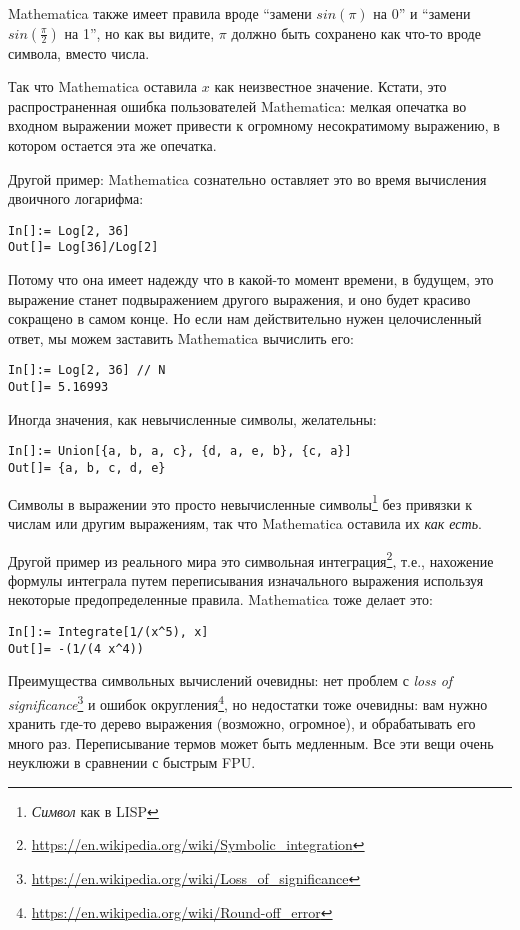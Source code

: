 Mathematica также имеет правила вроде ``замени $sin(\pi)$ на 0'' и ``замени $sin(\frac{\pi}{2})$ на 1'', но как вы видите,
$\pi$ должно быть сохранено как что-то вроде символа, вместо числа.

Так что Mathematica оставила $x$ как неизвестное значение.
Кстати, это распространенная ошибка пользователей Mathematica: мелкая опечатка во входном выражении может привести к
огромному несократимому выражению, в котором остается эта же опечатка.

Другой пример: Mathematica сознательно оставляет это во время вычисления двоичного логарифма:

\begin{lstlisting}
In[]:= Log[2, 36]
Out[]= Log[36]/Log[2]
\end{lstlisting}

Потому что она имеет надежду что в какой-то момент времени, в будущем, это выражение станет подвыражением другого
выражения, и оно будет красиво сокращено в самом конце.
Но если нам действительно нужен целочисленный ответ, мы можем заставить Mathematica вычислить его:

\begin{lstlisting}
In[]:= Log[2, 36] // N
Out[]= 5.16993
\end{lstlisting}

Иногда значения, как невычисленные символы, желательны:

\begin{lstlisting}
In[]:= Union[{a, b, a, c}, {d, a, e, b}, {c, a}]
Out[]= {a, b, c, d, e}
\end{lstlisting}

Символы в выражении это просто невычисленные символы\footnote{\textit{Символ} как в LISP} без привязки
к числам или другим выражениям, так что Mathematica оставила их \textit{как есть}.

Другой пример из реального мира это символьная интеграция\footnote{\url{https://en.wikipedia.org/wiki/Symbolic_integration}}, 
т.е., нахожение формулы интеграла путем переписывания изначального выражения используя некоторые предопределенные правила.
Mathematica тоже делает это:

\begin{lstlisting}
In[]:= Integrate[1/(x^5), x]
Out[]= -(1/(4 x^4))
\end{lstlisting}

Преимущества символьных вычислений очевидны: нет проблем с \textit{loss of significance}\footnote{\url{https://en.wikipedia.org/wiki/Loss_of_significance}} и ошибок округления\footnote{\url{https://en.wikipedia.org/wiki/Round-off_error}}, 
но недостатки тоже очевидны: вам нужно хранить где-то дерево выражения (возможно, огромное), и обрабатывать его много раз.
Переписывание термов может быть медленным.
Все эти вещи очень неуклюжи в сравнении с быстрым \ac{FPU}.

